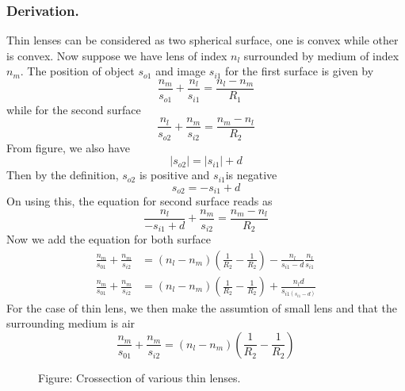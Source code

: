 \documentclass[../../../main.tex]{subfiles}
\begin{document}
\subsubsection*{Derivation.} Thin lenses can be considered as two spherical surface, one is convex while other is convex. Now suppose we have lens of index $n_l$ surrounded by medium of index $n_m$. The position of object $s_{o1}$ and image $s_{i1}$ for the first surface is given by 
\begin{equation*}
    \frac{n_m}{s_{o1}}+\frac{n_l}{s_{i1}}=\frac{n_l-n_m}{R_1}
\end{equation*}
while for the second surface 
\begin{equation*}
    \frac{n_l}{s_{o2}}+\frac{n_m}{s_{i2}}=\frac{n_m-n_l}{R_2}
\end{equation*}
From figure, we also have 
\begin{equation*}
    |s_{o2}|=|s_{i1}|+d
\end{equation*}
Then by the definition, $s_{o2}$ is positive and $s_{i1}$is negative
\begin{equation*}
    s_{o2} =-s_{i1}+d
\end{equation*}
On using this, the equation for second surface reads as 
\begin{equation*}
    \frac{n_l}{-s_{i1}+d}+\frac{n_m}{s_{i2}}=\frac{n_m-n_l}{R_2}
\end{equation*}
Now we add the equation for both surface 
\begin{align*}
    \frac{n_m}{s_{01}}+\frac{n_m}{s_{i2}}&=(n_l-n_m)\left(\frac{1}{R_2}-\frac{1}{R_2}\right)-\frac{n_l}{s_{i1}-d}\frac{n_l}{s_{i1}}\\
    \frac{n_m}{s_{01}}+\frac{n_m}{s_{i2}}&=(n_l-n_m)\left(\frac{1}{R_2}-\frac{1}{R_2}\right)+\frac{n_l d}{s_{i1(s_{i1}-d)}}
\end{align*}
For the case of thin lens, we then make the assumtion of small lens and that the surrounding medium is air 
\begin{equation*}
    \frac{n_m}{s_{01}}+\frac{n_m}{s_{i2}}=(n_l-n_m)\left(\frac{1}{R_2}-\frac{1}{R_2}\right)
\end{equation*}

\begin{figure}
    \centering
    \caption*{Figure: Crossection of various thin lenses.}
\end{figure}
\end{document}
